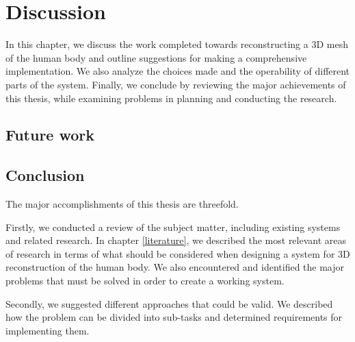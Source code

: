 \chapter{Discussion}

In this chapter, we discuss the work completed towards reconstructing a 3D mesh of the human body and outline suggestions for making a comprehensive implementation. We also analyze the choices made and the operability of different parts of the system. Finally, we conclude by reviewing the major achievements of this thesis, while examining problems in planning and conducting the research.



\section{Future work}

\section{Conclusion}

The major accomplishments of this thesis are threefold.

Firstly, we conducted a review of the subject matter, including existing systems and related research. In chapter \ref{literature}, we described the most relevant areas of research in terms of what should be considered when designing a system for 3D reconstruction of the human body. We also encountered and identified the major problems that must be solved in order to create a working system.

Secondly, we suggested different approaches that could be valid. We described how the problem can be divided into sub-tasks and determined requirements for implementing them.

